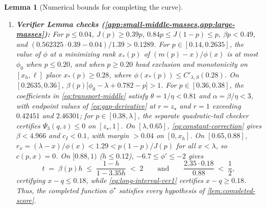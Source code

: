 \documentclass[11pt]{article}
\numberwithin{equation}{section}
\theoremstyle{plain}
\newtheorem{lemma}[theorem]{Lemma}
\theoremstyle{definition}
\newcommand{\1}{\mathbf{1}}
\begin{document}
\begin{lemma}[Numerical bounds for completing the curve]
\begin{enumerate}[label=(\roman*)]
  \[
    (1 - h)\kappa(h) \;\le\; 2.122 + 140(S - 0.02271790) - \bigl[3.774 + 700(S - 0.02271790)\bigr]h,
  \]
  and \cref{eq:tail-binary-integral} holds with \cref{eq:remaining-slack-envelope} on $q \in [0.2918, 0.337]$, $h \in [0.02, 0.0875]$, $c \in [0.2918, 0.305]$. For $h \le 0.02$, $\kappa(h) \le \kappa(0) \le 2.122 + 140(S - 0.02271790)$, and integrating \cref{eq:sigma-pointwise-floor} at $h = 0.02$ certifies $q \in [0.25, 0.337]$.
  \item \textbf{Verifier Lemma checks (\cref{app:small-middle-masses,app:large-masses}):} For $p \le 0.04$, $J(p) \ge 0.39p$, $0.84p \le J(1 - p) \le p$, $\beta p < 0.49$, and $(0.562325 \cdot 0.39 - 0.04)/1.39 > 0.1289$. For $p \in [0.14, 0.2635]$, the value of $\phi$ at a minimizing rank $x_*(p)$ of $(m(p) - x)/\phi(x)$ is at most $\phi_0$ when $p \le 0.20$, and when $p \ge 0.20$ head exclusion and monotonicity on $[x_h, \ell]$ place $x_*(p) \ge 0.28$, where $\phi(x_*(p)) \le C'_{\lambda, S}(0.28)$. On $[0.2635, 0.36]$, $\beta(p)\bigl[\phi_0 - \lambda + 0.782 - p\bigr] > 1$. For $p \in [0.36, 0.38]$, the coefficients in \cref{eq:transport-middle} satisfy $\theta = 1/\eta < 0.81$ and $\alpha = \beta/\eta < 3$, with endpoint values of \cref{eq:gap-derivative} at $r = z_\star$ and $r = 1$ exceeding $0.42451$ and $2.46301$; for $p \in [0.38, \lambda]$, the separate quadratic-tail checker certifies $\Psi_3(q, z) \le 0$ on $[z_\star, 1]$. On $[\lambda, 0.65]$, \cref{eq:constant-correction} gives $\beta < 4.966$ and $c_I < 0.1$, with margin $> 0.04$ on $[0, x_h]$. On $[0.65, 0.88]$, $r_x = (\lambda - x)/\phi(x) < 1.29 < p(1 - p)/J(p)$ for all $x < \lambda$, so $c(p, x) = 0$. On $[0.88, 1)$ ($h \le 0.12$), $-6.7 \le \phi' \le -2$ gives
  \[
    t \;=\; \beta(p)h \;\le\; \frac{1 - h}{1 - 3.35h} \;<\; 2
    \qquad\text{and}\qquad
    \frac{2.35 \cdot 0.18}{0.88} \;<\; \frac{1}{2},
  \]
  certifying $x - q \le 0.18$, while \cref{eq:long-interval-ver1} certifies $x - q \ge 0.18$. Thus, the completed function $\phi^\star$ satisfies every hypothesis of \cref{lem:completed-score}.
\end{enumerate}
\end{lemma}
\end{document}
